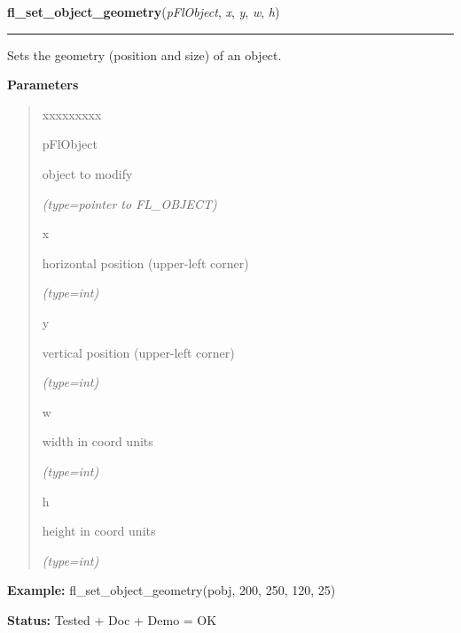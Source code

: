 \hspace{.8\funcindent}\begin{boxedminipage}{\funcwidth}

    \raggedright \textbf{fl\_set\_object\_geometry}(\textit{pFlObject}, \textit{x}, \textit{y}, \textit{w}, \textit{h})

    \vspace{-1.5ex}

    \rule{\textwidth}{0.5\fboxrule}
\setlength{\parskip}{2ex}
    Sets the geometry (position and size) of an object.

\setlength{\parskip}{1ex}
      \textbf{Parameters}
      \vspace{-1ex}

      \begin{quote}
        \begin{Ventry}{xxxxxxxxx}

          \item[pFlObject]

          object to modify

            {\it (type=pointer to FL\_OBJECT)}

          \item[x]

          horizontal position (upper-left corner)

            {\it (type=int)}

          \item[y]

          vertical position (upper-left corner)

            {\it (type=int)}

          \item[w]

          width in coord units

            {\it (type=int)}

          \item[h]

          height in coord units

            {\it (type=int)}

        \end{Ventry}

      \end{quote}

\textbf{Example:} fl\_set\_object\_geometry(pobj, 200, 250, 120, 25)



\textbf{Status:} Tested + Doc + Demo = OK



    \end{boxedminipage}

